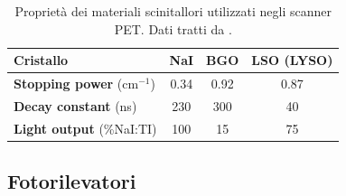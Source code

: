 \begin{table}[h]
	\centering
	\begin{tabular}{l|ccc}
		\hline
		\textbf{Cristallo} & NaI & BGO & LSO (LYSO) \\ \hline
		\textbf{Stopping power} ($\unit{\centi\meter}^{-1}$) & 0.34 & 0.92 & 0.87  \\ \hline
		\textbf{Decay constant} (\unit{\nano\second}) & 230 & 300 & 40 \\ \hline
		\textbf{Light output} (\%NaI:TI) & 100 & 15 & 75 \\ \hline
	\end{tabular}
	\caption{Proprietà dei materiali scinitallori utilizzati negli scanner PET. Dati tratti da \cite{RamseyDerek}.}
	\label{tab:scintillator_properties}
\end{table}

\subsection{Fotorilevatori}